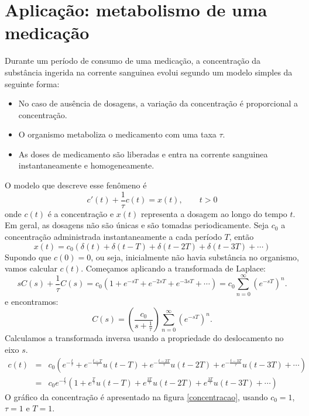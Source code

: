 \section{Aplicação: metabolismo de uma medicação}
Durante um período de consumo de uma medicação, a concentração da substância ingerida na corrente sanguinea evolui segundo um modelo simples da seguinte forma:
\begin{itemize}
 \item No caso de ausência de dosagens, a variação da concentração é proporcional a concentração.
 \item  O organismo metaboliza o medicamento com uma taxa $\tau$.
  \item As doses de medicamento são liberadas e entra na corrente sanguinea instantaneamente e homogeneamente.
\end{itemize}
O modelo que descreve esse fenômeno é
\begin{equation}
c'(t)+\frac{1}{\tau}c(t)=x(t),\qquad t>0
\end{equation}
onde $c(t)$ é a concentração e $x(t)$ representa a dosagem ao longo do tempo $t$. Em geral, as dosagens não são únicas e são tomadas periodicamente. Seja $c_0$ a concentração administrada instantaneamente a cada período $T$, então
\begin{equation}
x(t)=c_0\left(\delta(t)+\delta(t-T)+\delta(t-2T)+\delta(t-3T)+\cdots\right)
\end{equation}
Supondo que $c(0)=0$, ou seja, inicialmente não havia substância no organismo, vamos calcular $c(t)$. 
Começamos aplicando a transformada de Laplace:
\begin{equation}
sC(s)+\frac{1}{\tau}C(s)=c_0\left(1+e^{-sT}+e^{-2sT}+e^{-3sT}+\cdots\right)=c_0\sum_{n=0}^\infty\left( e^{-sT}\right)^n.
\end{equation}
e encontramos:
\begin{equation}
C(s)=\left(\frac{c_0}{ s+\frac{1}{\tau}}\right)\sum_{n=0}^\infty\left( e^{-sT}\right)^n.
\end{equation}
Calculamos a transformada inversa usando a propriedade do deslocamento no eixo $s$.
\begin{eqnarray*}
c(t)&=&c_0\left(e^{-\frac{t}{\tau}}+e^{-\frac{t-T}{\tau}}u(t-T)+e^{-\frac{t-2T}{\tau}}u(t-2T)+e^{-\frac{t-3T}{\tau}}u(t-3T)+\cdots\right) \\
&=&c_0e^{-\frac{t}{\tau}}\left(1+e^{\frac{T}{\tau}}u(t-T)+e^{\frac{2T}{\tau}}u(t-2T)+e^{\frac{3T}{\tau}}u(t-3T)+\cdots\right)
\end{eqnarray*}
 O gráfico da concentração é apresentado na figura \ref{concentracao}, usando $c_0=1$, $\tau=1$ e $T=1$.
